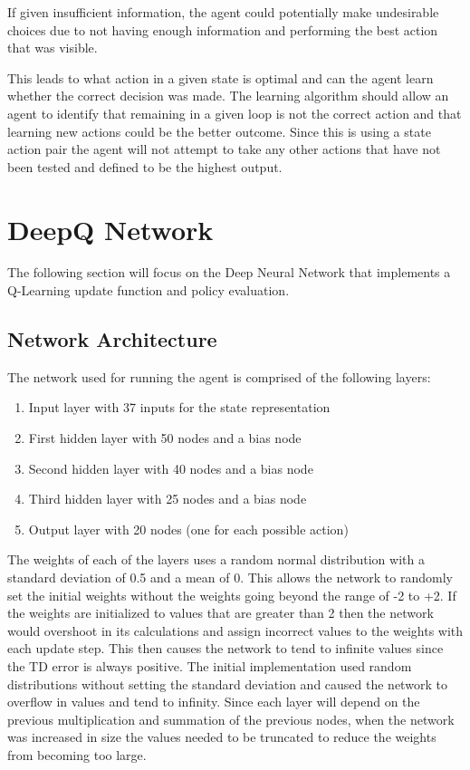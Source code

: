 If given insufficient information, the agent could potentially make undesirable
choices due to not having enough information and performing the best
action that was visible.

This leads to what action in a given state is optimal and can the agent learn whether
the correct decision was made. The learning algorithm should allow an agent
to identify that remaining in a given loop is not the correct action and that learning
new actions could be the better outcome.
Since this is using a state action pair the agent will not attempt to take any
other actions that have not been tested and defined to be the highest output.

\section{DeepQ Network}

The following section will focus on the Deep Neural Network that implements a
Q-Learning update function and policy evaluation.

\subsection{Network Architecture}

The network used for running the agent is comprised of the following layers:

\begin{enumerate}
    \item Input layer with 37 inputs for the state representation
    \item First hidden layer with 50 nodes and a bias node
    \item Second hidden layer with 40 nodes and a bias node
    \item Third hidden layer with 25 nodes and a bias node
    \item Output layer with 20 nodes (one for each possible action)
\end{enumerate}

The weights of each of the layers uses a random normal distribution with a
standard deviation of 0.5 and a mean of 0. This allows the network to randomly
set the initial weights without the weights going beyond the range of -2 to +2.
If the weights are initialized to values that are greater than 2 then the
network would overshoot in its calculations and assign incorrect values to the
weights with each update step. This then causes the network to tend to infinite
values since the TD error is always positive. The initial implementation used
random distributions without setting the standard deviation and caused the
network to overflow in values and tend to infinity. Since each layer will depend
on the previous multiplication and summation of the previous nodes, when the
network was increased in size the values needed to be truncated to reduce the
weights from becoming too large.

